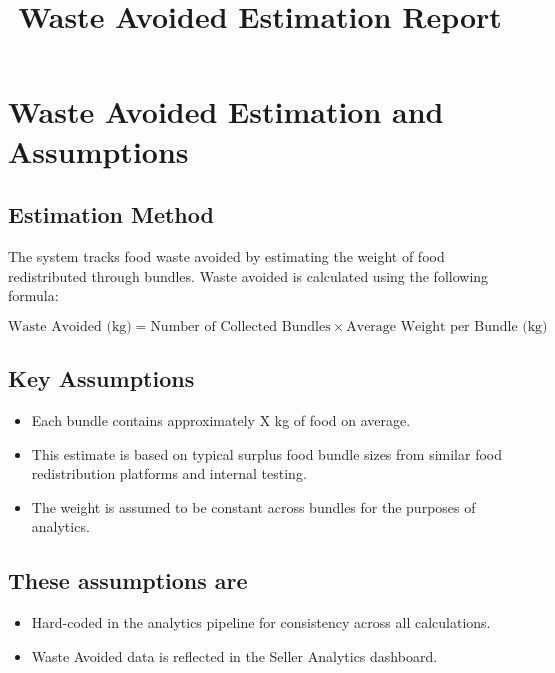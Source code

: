 \documentclass[12pt]{article}
\title{Waste Avoided Estimation Report}
\begin{document}
\maketitle

\section{Waste Avoided Estimation and Assumptions}


\subsection{Estimation Method}
The system tracks food waste avoided by estimating the weight of food redistributed through bundles. Waste avoided is calculated using the following formula:

\begin{equation}
\text{Waste Avoided (kg)} = \text{Number of Collected Bundles} \times \text{Average Weight per Bundle (kg)}
\end{equation}


\subsection{Key Assumptions}
\begin{itemize}

    \item Each bundle contains approximately X kg of food on average.
    \item This estimate is based on typical surplus food bundle sizes from similar food redistribution platforms and internal testing.
    \item The weight is assumed to be constant across bundles for the purposes of analytics.
\end{itemize}




\subsection{These assumptions are}

\begin{itemize}
    \item Hard-coded in the analytics pipeline for consistency across all calculations.
    \item Waste Avoided data  is reflected in the Seller Analytics dashboard.
\end{itemize}
\end{document}
